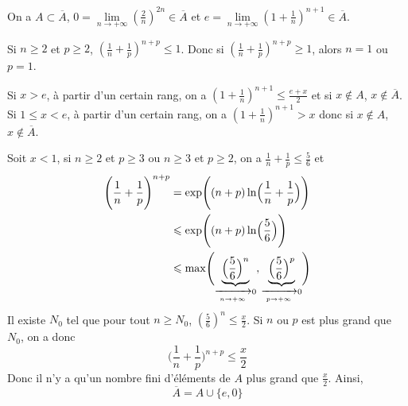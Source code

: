 \begin{solution}
	On a $A\subset\overline{A}$, $0=\lim\limits_{n\to+\infty}(\frac{2}{n})^{2n}\in\overline{A}$ et $e=\lim\limits_{n\to+\infty}(1+\frac{1}{n})^{n+1}\in\overline{A}$.

	Si $n\geqslant2$ et $p\geqslant2$, $(\frac{1}{n}+\frac{1}{p})^{n+p}\leqslant1$. Donc si $(\frac{1}{n}+\frac{1}{p})^{n+p}\geqslant1$, alors $n=1$ ou $p=1$.

	Si $x>e$, à partir d'un certain rang, on a $(1+\frac{1}{n})^{n+1}\leqslant\frac{e+x}{2}$ et si $x\notin A$, $x\notin\overline{A}$.
	Si $1\leqslant x<e$, à partir d'un certain rang, on a $(1+\frac{1}{n})^{n+1}>x$ donc si $x\notin A$, $x\notin\overline{A}$.

	Soit $x<1$, si $n\geqslant2$ et $p\geqslant3$ ou $n\geqslant3$ et $p\geqslant2$, on a $\frac{1}{n}+\frac{1}{p}\leqslant\frac{5}{6}$ et 
	\begin{align*}
		\Biggl(\frac{1}{n}+\frac{1}{p}\Biggr)^{n+p}
		&=\exp\Biggl((n+p)\ln\Bigl(\frac{1}{n}+\frac{1}{p}\Bigr)\Biggr)\\
		&\leqslant\exp\Biggl((n+p)\ln\Bigl(\frac{5}{6}\Bigr)\Biggr)\\
		&\leqslant\max\Biggl(\underbrace{\Bigl(\frac{5}{6}\Bigr)^{n}}_{\xrightarrow[n\to+\infty]{}0},\underbrace{\Bigl(\frac{5}{6}\Bigr)^{p}}_{\xrightarrow[p\to+\infty]{}0}\Biggr)
	\end{align*}
	Il existe $N_{0}$ tel que pour tout $n\geqslant N_{0}$, $(\frac{5}{6})^{n}\leqslant\frac{x}{2}$. Si $n$ ou $p$ est plus grand que $N_{0}$, on a donc 
	$$\Biggl(\frac{1}{n}+\frac{1}{p}\Biggr)^{n+p}\leqslant\frac{x}{2}$$
	Donc il n'y a qu'un nombre fini d'éléments de $A$ plus grand que $\frac{x}{2}$. Ainsi,
	$$\overline{A}=A\cup\{e,0\}$$
\end{solution}

